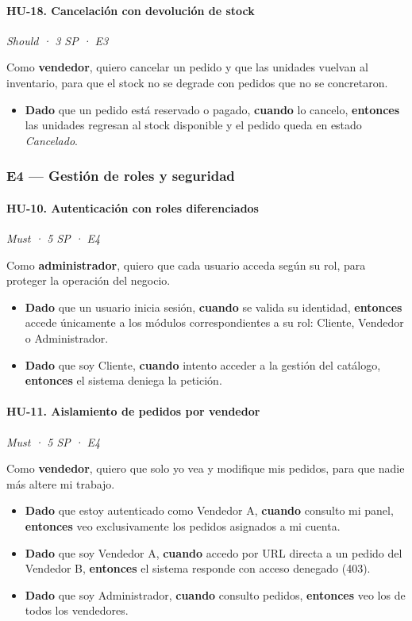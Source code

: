 \documentclass[12pt, a4paper]{article}
\newcommand{\hutag}[3]{\textit{#1 · #2 · #3}\par\vspace{2pt}}
\begin{document}
\paragraph{HU-18. Cancelación con devolución de stock}
\hutag{Should}{3 SP}{E3}
Como \textbf{vendedor}, quiero cancelar un pedido y que las unidades vuelvan al inventario, para que el stock no se degrade con pedidos que no se concretaron.
\begin{itemize}[leftmargin=*]
    \item \textbf{Dado} que un pedido está reservado o pagado, \textbf{cuando} lo cancelo, \textbf{entonces} las unidades regresan al stock disponible y el pedido queda en estado \textit{Cancelado}.
\end{itemize}

\subsubsection{E4 --- Gestión de roles y seguridad}

\paragraph{HU-10. Autenticación con roles diferenciados}
\hutag{Must}{5 SP}{E4}
Como \textbf{administrador}, quiero que cada usuario acceda según su rol, para proteger la operación del negocio.
\begin{itemize}[leftmargin=*]
    \item \textbf{Dado} que un usuario inicia sesión, \textbf{cuando} se valida su identidad, \textbf{entonces} accede únicamente a los módulos correspondientes a su rol: Cliente, Vendedor o Administrador.
    \item \textbf{Dado} que soy Cliente, \textbf{cuando} intento acceder a la gestión del catálogo, \textbf{entonces} el sistema deniega la petición.
\end{itemize}

\paragraph{HU-11. Aislamiento de pedidos por vendedor}
\hutag{Must}{5 SP}{E4}
Como \textbf{vendedor}, quiero que solo yo vea y modifique mis pedidos, para que nadie más altere mi trabajo.
\begin{itemize}[leftmargin=*]
    \item \textbf{Dado} que estoy autenticado como Vendedor A, \textbf{cuando} consulto mi panel, \textbf{entonces} veo exclusivamente los pedidos asignados a mi cuenta.
    \item \textbf{Dado} que soy Vendedor A, \textbf{cuando} accedo por URL directa a un pedido del Vendedor B, \textbf{entonces} el sistema responde con acceso denegado (403).
    \item \textbf{Dado} que soy Administrador, \textbf{cuando} consulto pedidos, \textbf{entonces} veo los de todos los vendedores.
\end{itemize}
\end{document}
